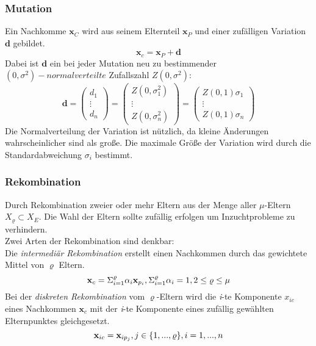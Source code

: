 \subsubsection[Mutation]{Mutation}
Ein Nachkomme $\mathbf{x}_C$ wird aus seinem Elternteil $\mathbf{x}_P$ und einer zufälligen Variation $\mathbf{d}$ gebildet.
\begin{equation} \label{eq:Mutation_Child}
	\mathbf{x}_c = \mathbf{x}_P + \mathbf{d}
\end{equation}
Dabei ist $\mathbf{d}$ ein bei jeder Mutation neu zu bestimmender $(0,\sigma^2)-normalverteilte$ Zufallszahl $Z(0,\sigma^2)$:
\begin{equation}\label{eq:wavenumber_trilateration_model2}
\mathbf{d}=
\left(
	\begin{array}{c}
		d_1 \\
		\vdots\\
		d_n 
	\end{array}
\right)
=
\left(
	\begin{array}{c}
		Z(0,\sigma_1^2) \\
		\vdots\\
		Z(0,\sigma_n^2) 
	\end{array}
\right)
=
\left(
	\begin{array}{c}
		Z(0,1) \sigma_1 \\
		\vdots\\
		Z(0,1) \sigma_n 
	\end{array}
\right)
\end{equation}
%
Die Normalverteilung der Variation ist nützlich, da kleine Änderungen wahrscheinlicher sind als große. Die maximale Größe der Variation wird durch die Standardabweichung $\sigma_i$ bestimmt.
%
\subsubsection[Rekombination]{Rekombination}
Durch Rekombination zweier oder mehr Eltern aus der Menge aller $\mu$-Eltern $X_{\varrho} \subset X_E$. Die Wahl der Eltern sollte zufällig erfolgen um Inzuchtprobleme zu verhindern.\\
Zwei Arten der Rekombination sind denkbar:\\

Die \textit{intermediär Rekombination} erstellt einen Nachkommen durch das gewichtete Mittel von $\varrho$ Eltern.
%
\begin{equation}
\mathbf{x}_c = \Sigma^\varrho_{i=1} \alpha_i\mathbf{x}_{p_i},\\ \Sigma^\varrho_{i=1} \alpha_i = 1,\\ 2\leq\varrho\leq\mu
\end{equation} 
%
Bei der \textit{diskreten Rekombination} vom $\varrho$-Eltern wird die \textit{i}-te Komponente $x_{ic}$ eines Nachkommen $\mathbf{x}_c$ mit der \textit{i}-te Komponente eines zufällig gewählten Elternpunktes gleichgesetzt.
%
\begin{equation}
\mathbf{x}_{ic} = \mathbf{x}_{ip_j},\\ j\in\{1,...,\varrho\},\\i=1,...,n
\end{equation} 
%
